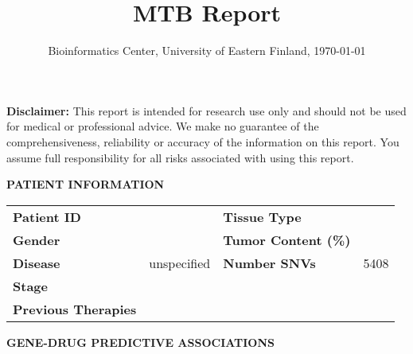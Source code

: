 \documentclass[9pt]{article}\usepackage[]{graphicx}\usepackage[table,dvipsnames]{xcolor}
\begin{document}


\title{\vspace{-2.5cm}\textbf{MTB Report}}
\author{Bioinformatics Center, University of Eastern Finland, \today}
\date{}
\maketitle


\vspace{-01cm}
\begin{tcolorbox}[colframe=white,colback=white,halign=left,arc=6mm,top=2mm]
\fontsize{7}{8}\selectfont
\textbf{Disclaimer:} This report is intended for research use only and should not be used for medical or professional advice. We make no guarantee of the comprehensiveness, reliability or accuracy of the information on this report. You assume full responsibility for all risks associated with using this report.
\end{tcolorbox}



\vspace{-0.2cm}
 
\begin{tcolorbox}[colframe=gray!40!white,width=17cm,height=0.7cm,valign=center]
\textbf{\large{PATIENT INFORMATION}}
\end{tcolorbox}

\begin{table}[h]
\centering
\begin{tabular}{p{1.7in}p{2in}p{1.5in}p{1in}}
\textbf{Patient ID}         &                    & \textbf{Tissue Type}        &      \\
\textbf{Gender}             &          & \textbf{Tumor Content (\%)} &     \\ 
\textbf{Disease}            & unspecified               & \textbf{Number SNVs}        &  5408          \\ 
\textbf{Stage}              &        \\   
\textbf{Previous Therapies} &      \\ 
\end{tabular}
\end{table}




\begin{tcolorbox}[colframe=gray!40!white,width=17cm,height=0.7cm,valign=center]
\textbf{\large{GENE-DRUG PREDICTIVE ASSOCIATIONS}}
\end{tcolorbox}
\end{document}
